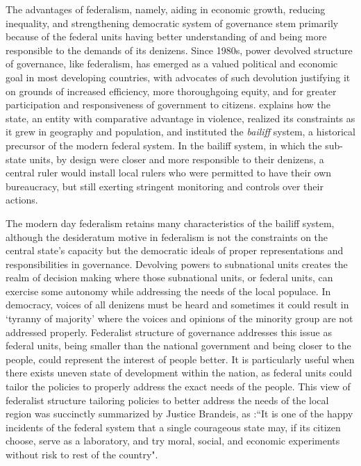  
The advantages of federalism, namely, aiding in economic growth, reducing inequality, and strengthening democratic system of governance stem primarily because of the federal units having better understanding of and being more responsible to the demands of its denizens. Since 1980s, power devolved structure of governance, like federalism, has emerged as a valued political and economic goal in most developing countries, with advocates of such devolution justifying it on grounds of increased efficiency, more thoroughgoing equity, and for greater participation and responsiveness of government to citizens\cite{Agrawal2000}.   explains how the state, an entity with comparative advantage in violence, realized its constraints as it grew in geography and population, and instituted the \emph{bailiff} system, a historical precursor of the modern federal system. In the bailiff system, in which the sub-state units, by design were closer and more responsible to their denizens, a central ruler would install local rulers who were permitted to have their own bureaucracy, but still exerting stringent monitoring and controls over their actions.\par
 The modern day federalism retains many characteristics of the bailiff system, although the desideratum motive in federalism is not the constraints on the central state's capacity but the democratic ideals of proper representations and responsibilities in governance. Devolving powers to subnational units creates the realm of decision making where those subnational units, or federal units, can exercise some autonomy while addressing the needs of the local populace. In democracy, voices of all denizens must be heard and sometimes it could result in `tyranny of majority' where the voices and opinions of the minority group are not addressed properly. Federalist structure of governance addresses this issue as federal units, being smaller than the national government and being closer to the people, could represent the interest of people better. It is particularly useful when there exists uneven state of development within the nation, as federal units could tailor the policies to properly address the exact needs of the people. This view of federalist structure tailoring policies to better address the needs of the local region was succinctly summarized by Justice Brandeis, as :``It is one of the happy incidents of the federal system that a single courageous state may, if its citizen choose, serve as a laboratory, and try moral, social, and economic experiments without risk to rest of the country"\cite{Rosen2016}. \par

